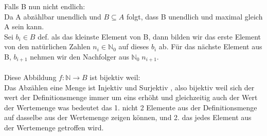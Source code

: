 \documentclass[paper = a4, ngerman]{scrartcl}
\begin{document}
Falls B nun nicht endlich:\\
Da A abzählbar unendlich und $B \subseteq A$  folgt, dass B unendlich und maximal gleich A sein kann.\\
 Sei $b_i \in B$ def. als das kleinste Element von B, dann bilden wir das erste Element von den natürlichen Zahlen $n_i \in \mathbb{N}_{0}$ auf dieses $b_i$ ab. Für das nächste Element aus B, $b_{i+1}$ nehmen wir den Nachfolger aus $\mathbb{N}_{0}\; n_{i+1}$.\\\\
 Diese Abbildung $f: \mathbb{N} \rightarrow B$ ist bijektiv weil:\\
 Das Abzählen eine Menge ist Injektiv und Surjektiv , also bijektiv weil sich der wert der Definitionsmenge immer um eins erhöht und gleichzeitig auch der Wert der Wertemenge was bedeutet das 1. nicht 2 Elemente aus der Definitionsmenge auf dasselbe aus der Wertemenge zeigen können, und 2. das jedes Element aus der Wertemenge getroffen wird. 
 
	

	
	
\end{document}
